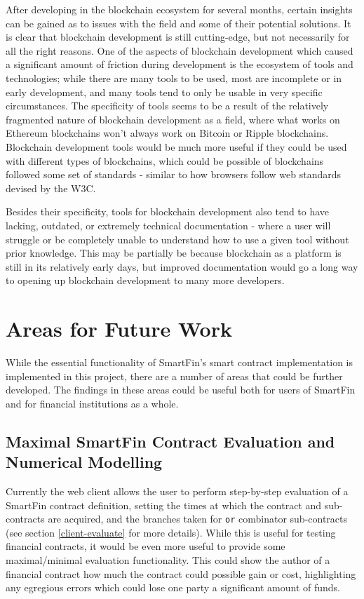 After developing in the blockchain ecosystem for several months, certain insights can be gained as to issues with the field and some of their potential solutions. It is clear that blockchain development is still cutting-edge, but not necessarily for all the right reasons. One of the aspects of blockchain development which caused a significant amount of friction during development is the ecosystem of tools and technologies; while there are many tools to be used, most are incomplete or in early development, and many tools tend to only be usable in very specific circumstances. The specificity of tools seems to be a result of the relatively fragmented nature of blockchain development as a field, where what works on Ethereum blockchains won't always work on Bitcoin or Ripple blockchains. Blockchain development tools would be much more useful if they could be used with different types of blockchains, which could be possible of blockchains followed some set of standards - similar to how browsers follow web standards devised by the W3C\cite{w3c-standards}.

Besides their specificity, tools for blockchain development also tend to have lacking, outdated, or extremely technical documentation -  where a user will struggle or be completely unable to understand how to use a given tool without prior knowledge. This may be partially be because blockchain as a platform is still in its relatively early days, but improved documentation would go a long way to opening up blockchain development to many more developers.


\section{Areas for Future Work}

While the essential functionality of SmartFin's smart contract implementation is implemented in this project, there are a number of areas that could be further developed. The findings in these areas could be useful both for users of SmartFin and for financial institutions as a whole.

\subsection{Maximal SmartFin Contract Evaluation and Numerical Modelling}

Currently the web client allows the user to perform step-by-step evaluation of a SmartFin contract definition, setting the times at which the contract and sub-contracts are acquired, and the branches taken for \texttt{or} combinator sub-contracts (see section \ref{client-evaluate} for more details). While this is useful for testing financial contracts, it would be even more useful to provide some maximal/minimal evaluation functionality. This could show the author of a financial contract how much the contract could possible gain or cost, highlighting any egregious errors which could lose one party a significant amount of funds. \\


